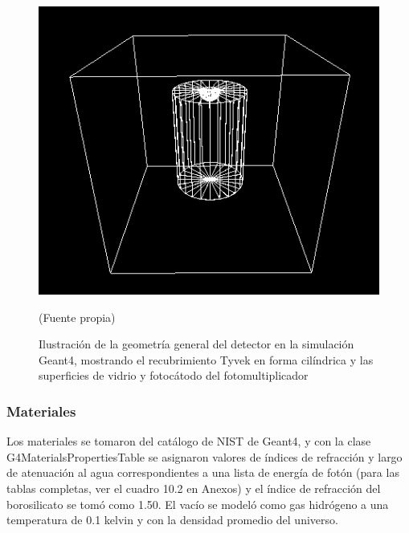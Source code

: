 \documentclass{book}
\begin{document}
\begin{figure}[h] %
\begin{center}
 \includegraphics[width = 0.5\linewidth]{GeometriaG4.png}
 
(Fuente propia)
\caption{Ilustraci\'on de la geometr\'ia general del detector en la simulaci\'on Geant4, mostrando el recubrimiento Tyvek en forma cil\'indrica y las superficies de vidrio y fotoc\'atodo del fotomultiplicador}
\end{center}
\end{figure}

\subsubsection{Materiales}
Los materiales se tomaron del cat\'alogo de NIST de Geant4, y con la clase G4MaterialsPropertiesTable se asignaron valores de \'indices de refracci\'on y largo de atenuaci\'on al agua correspondientes a una lista de energ\'ia de fot\'on (para las tablas completas, ver el cuadro 10.2 en Anexos) y el \'indice de refracci\'on del borosilicato se tom\'o como 1.50. El vac\'io se model\'o como gas hidr\'ogeno a una temperatura de 0.1 kelvin y con la densidad promedio del universo.
\end{document}
